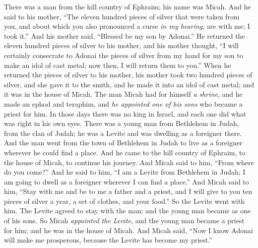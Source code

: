 \begin{biblechapter} %
 There was a man from the hill country of Ephraim; his name was Micah.
\verse And he said to his mother, “The eleven hundred pieces of silver that were taken from you, and about which you also pronounced a curse \textit{in my hearing}, are with me; I took it.” And his mother said, “Blessed be my son by Adonai.”
\verse He returned the eleven hundred pieces of silver to his mother, and his mother thought, “I will certainly consecrate to Adonai the pieces of silver from my hand for my son to make an idol of cast metal; now then, I will return them to you.”
\verse When he returned the pieces of silver to his mother, his mother took two hundred pieces of silver, and she gave it to the smith, and he made it into an idol of cast metal; and it was in the house of Micah.
\verse The man Micah had for himself \textit{a shrine}, and he made an ephod and teraphim, and \textit{he appointed one of his sons} who became a priest for him.
\verse In those days there was no king in Israel, and each one did what was right in his own eyes.
\verse There was a young man from Bethlehem in Judah, from the clan of Judah; he was a Levite and was dwelling as a foreigner there.
\verse And the man went from the town of Bethlehem in Judah to live as a foreigner wherever he could find a place. And he came to the hill country of Ephraim, to the house of Micah, to continue his journey.
\verse And Micah said to him, “From where do you come?” And he said to him, “I am a Levite from Bethlehem in Judah; I am going to dwell as a foreigner wherever I can find a place.”
\verse And Micah said to him, “Stay with me and be to me a father and a priest, and I will give to you ten pieces of silver a year, a set of clothes, and your food.” So the Levite went with him.
\verse The Levite agreed to stay with the man; and the young man became as one of his sons.
\verse So Micah \textit{appointed the Levite}, and the young man became a priest for him; and he was in the house of Micah.
\verse And Micah said, “Now I know Adonai will make me prosperous, because the Levite has become my priest.”
\end{biblechapter}

